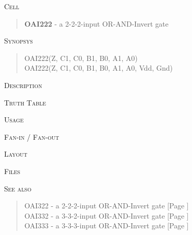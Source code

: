 
\label{OAI222}
\textsc{Cell}
\begin{quote}
    \textbf{OAI222} - a 2-2-2-input OR-AND-Invert gate
\end{quote}

\textsc{Synopsys}
\begin{quote}
    OAI222(Z, C1, C0, B1, B0, A1, A0) \\
    OAI222(Z, C1, C0, B1, B0, A1, A0, Vdd, Gnd)
\end{quote}

\textsc{Description}

%

\textsc{Truth Table}


\textsc{Usage}

\textsc{Fan-in / Fan-out}

\textsc{Layout}

\textsc{Files}

\textsc{See also}
\begin{quote}
    OAI322 - a 2-2-2-input OR-AND-Invert gate [Page \pageref{OAI322}] \\
    OAI332 - a 3-3-2-input OR-AND-Invert gate [Page \pageref{OAI332}] \\
    OAI333 - a 3-3-3-input OR-AND-Invert gate [Page \pageref{OAI333}]
\end{quote}
